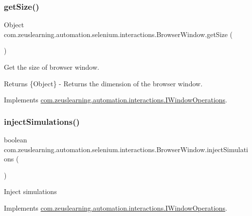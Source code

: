 \subsubsection{\texorpdfstring{get\+Size()}{getSize()}}
{\footnotesize\ttfamily Object com.\+zeuslearning.\+automation.\+selenium.\+interactions.\+Browser\+Window.\+get\+Size (\begin{DoxyParamCaption}{ }\end{DoxyParamCaption})\hspace{0.3cm}{\ttfamily [inline]}}

Get the size of browser window.

\begin{DoxyReturn}{Returns}
\{Object\} -\/ Returns the dimension of the browser window. 
\end{DoxyReturn}


Implements \hyperlink{interfacecom_1_1zeuslearning_1_1automation_1_1interactions_1_1IWindowOperations_a686ed29895edf5c89045fff9329b83f4}{com.\+zeuslearning.\+automation.\+interactions.\+I\+Window\+Operations}.

\hypertarget{classcom_1_1zeuslearning_1_1automation_1_1selenium_1_1interactions_1_1BrowserWindow_afd940a0c96c58bdedd01c1df95933852}{}\label{classcom_1_1zeuslearning_1_1automation_1_1selenium_1_1interactions_1_1BrowserWindow_afd940a0c96c58bdedd01c1df95933852} 
\subsubsection{\texorpdfstring{inject\+Simulations()}{injectSimulations()}}
{\footnotesize\ttfamily boolean com.\+zeuslearning.\+automation.\+selenium.\+interactions.\+Browser\+Window.\+inject\+Simulations (\begin{DoxyParamCaption}{ }\end{DoxyParamCaption})\hspace{0.3cm}{\ttfamily [inline]}}

Inject simulations 

Implements \hyperlink{interfacecom_1_1zeuslearning_1_1automation_1_1interactions_1_1IWindowOperations_a0976eede54bc52b1d8a75343c6d4b455}{com.\+zeuslearning.\+automation.\+interactions.\+I\+Window\+Operations}.

